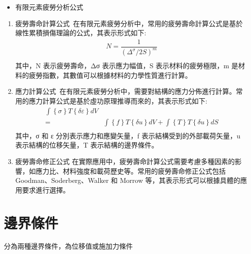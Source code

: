 \begin{itemize}
\item 有限元素疲勞分析公式
\end{itemize}
\begin{enumerate}

\item 疲勞壽命計算公式\
在有限元素疲勞分析中，常用的疲勞壽命計算公式是基於線性累積損傷理論的公式，其表示形式如下:\\
\[
\begin{aligned}
N=\dfrac{1}{\left( \Delta ^{\sigma }/2S\right) ^{m}}\\
\end{aligned}
\]
其中，N 表示疲勞壽命，Δσ 表示應力幅值，S 表示材料的疲勞極限，m 是材料的疲勞指數，其數值可以根據材料的力學性質進行計算。\\

\item 應力計算公式\
在有限元素疲勞分析中，需要對結構的應力分佈進行計算。常用的應力計算公式是基於虛功原理推導而來的，其表示形式如下:\\
\[
\begin{aligned}
\int \left\{ \sigma \right\} T\left\{ \delta \varepsilon \right\} dV\\
=&\int \left\{ f\right\} T\left\{ \delta u\right\} dV+\int \left\{ T\right\} T\left\{ \delta u\right\} dS\\
\end{aligned}
\]
其中，{σ} 和 {ε} 分別表示應力和應變矢量，{f} 表示結構受到的外部載荷矢量，{u} 表示結構的位移矢量，{T} 表示結構的邊界條件。\\

\item 疲勞壽命修正公式
在實際應用中，疲勞壽命計算公式需要考慮多種因素的影響，如應力比、材料強度和載荷歷史等。常用的疲勞壽命修正公式包括 Goodman、Soderberg、Walker 和 Morrow 等，其表示形式可以根據具體的應用要求進行選擇。
\end{enumerate}
\newpage

\section{邊界條件}
分為兩種邊界條件，為位移值或施加力條件

